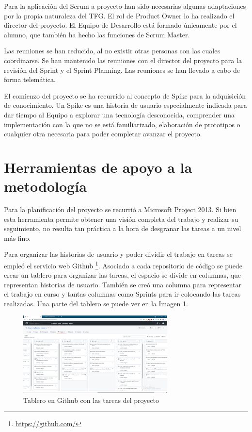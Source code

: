 Para la aplicación del Scrum a proyecto han sido necesarias algunas adaptaciones por la propia naturaleza del TFG. El rol de Product Owner lo ha realizado el director del proyecto. El Equipo de Desarrollo está formado únicamente por el alumno, que también ha hecho las funciones de Scrum Master.

Las reuniones se han reducido, al no existir otras personas con las cuales coordinarse. Se han mantenido las reuniones con el director del proyecto para la revisión del Sprint y el Sprint Planning. Las reuniones se han llevado a cabo de forma telemática.

El comienzo del proyecto se ha recurrido al concepto de Spike para la adquisición de conocimiento. Un Spike es una historia de usuario especialmente indicada para dar tiempo al Equipo a explorar una tecnología desconocida, comprender una implementación con la que no se está familiarizado, elaboración de prototipos o cualquier otra necesaria para poder completar avanzar el proyecto.

\section{Herramientas de apoyo a la metodología}

Para la planificación del proyecto se recurrió a Microsoft Project 2013. Si bien esta herramienta permite obtener una visión completa del trabajo y realizar su seguimiento, no resulta tan práctica a la hora de desgranar las tareas a un nivel más fino.

Para organizar las historias de usuario y poder dividir el trabajo en tareas se empleó el servicio web Github \footnote{\url{https://github.com/}}. Asociado a cada repositorio de código se puede crear un tablero para organizar las tareas, el espacio se divide en columnas, que representan historias de usuario. También se creó una columna para representar el trabajo en curso y tantas columnas como Sprints para ir colocando las tareas realizadas. Una parte del tablero se puede ver en la Imagen \ref{fig:tablero-github}.

\begin{figure}[hp!]
	\centering
	\includegraphics[angle=90,width=0.70\textwidth]{imaxes/f-planificacion/tablero-planificacion}
	\caption{Tablero en Github con las tareas del proyecto}
	\label{fig:tablero-github}
\end{figure}